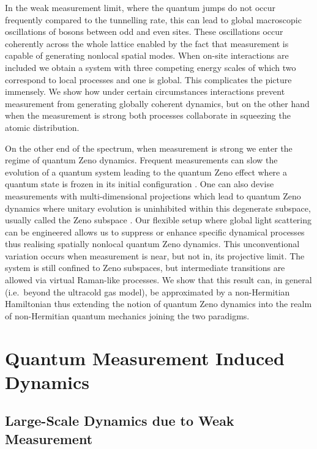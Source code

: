 In the weak measurement limit, where the quantum jumps do not occur
frequently compared to the tunnelling rate, this can lead to global
macroscopic oscillations of bosons between odd and even sites. These
oscillations occur coherently across the whole lattice enabled by the
fact that measurement is capable of generating nonlocal spatial
modes. When on-site interactions are included we obtain a system with
three competing energy scales of which two correspond to local
processes and one is global. This complicates the picture
immensely. We show how under certain circumstances interactions
prevent measurement from generating globally coherent dynamics, but on
the other hand when the measurement is strong both processes
collaborate in squeezing the atomic distribution.

On the other end of the spectrum, when measurement is strong we enter
the regime of quantum Zeno dynamics. Frequent measurements can slow
the evolution of a quantum system leading to the quantum Zeno effect
where a quantum state is frozen in its initial configuration
\cite{misra1977, facchi2008}. One can also devise measurements with
multi-dimensional projections which lead to quantum Zeno dynamics
where unitary evolution is uninhibited within this degenerate
subspace, usually called the Zeno subspace \cite{facchi2008,
  raimond2010, raimond2012, signoles2014}. Our flexible setup where global light
scattering can be engineered allows us to suppress or enhance specific
dynamical processes thus realising spatially nonlocal quantum Zeno
dynamics. This unconventional variation occurs when measurement is
near, but not in, its projective limit. The system is still confined
to Zeno subspaces, but intermediate transitions are allowed via
virtual Raman-like processes. We show that this result can, in general
(i.e.~beyond the ultracold gas model), be approximated by a
non-Hermitian Hamiltonian thus extending the notion of quantum Zeno
dynamics into the realm of non-Hermitian quantum mechanics joining the
two paradigms.

\section{Quantum Measurement Induced Dynamics}

\subsection{Large-Scale Dynamics due to Weak Measurement}

